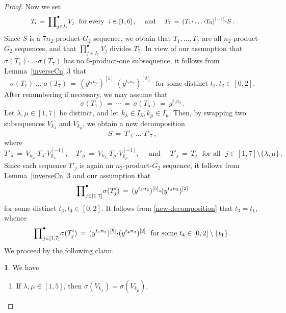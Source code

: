 \documentclass[leqno,a4paper]{amsart}
\def\bd{{\boldsymbol{\cdot}}}
\theoremstyle{plain}
\theoremstyle{definition}
\numberwithin{equation}{section}
\newtheorem{claim}{}[theorem]
\begin{document}
\begin{proof}
        Now we set
        \[
          T_i \, = \, \small{\prod}^{\bullet}_{j \in I_i} V_j \,\, \mbox{ for every } \,\, i \in [1,6] \,, \quad \mbox{ and } \quad T_7 \, = \, (T_1 \bd \ldots \bd T_6)^{[-1]} \bd S \,.
        \]
        Since $S$ is a $7n_2$-product-$G_2$ sequence, we obtain that $T_1, \ldots, T_7$ are all $n_2$-product-$G_2$ sequences, and that $\prod^{\bullet}_{j \in I_7} V_j$ divides $T_7$. In view of our assumption that $\sigma(T_1) \bd \ldots \bd \sigma(T_7)$ has no $6$-product-one subsequence,
		it follows from Lemma~\ref{inverseCn}.3 that
		\begin{equation}\label{str}
	    \sigma(T_1) \bd \ldots \bd \sigma(T_7) \, = \, (y^{t_1n_2})^{[5]} \bd (y^{t_2n_2})^{[2]} \,\, \text{ for some distinct $t_1,t_2 \in [0,2]$}.
		\end{equation}
        After renumbering if necessary, we may assume that
        \[
          \sigma(T_1) \, = \, \cdots \, = \, \sigma(T_5) \, = \, y^{t_1n_2}\,.
        \]	
		Let $\lambda, \mu \in [1,7]$ be distinct, and let $k_{\lambda} \in I_{\lambda}, k_{\mu}\in I_{\mu}$.
		Then, by swapping two subsequences $V_{k_{\lambda}}$ and $V_{k_{\mu}}$, we obtain a new decomposition
		\[
		S \, = \, T'_1 \bd \ldots \bd T'_7 \,,
		\]
		where
		\begin{equation}\label{new-decomposition}
		T'_{\lambda} \, = \, V_{k_{\mu}} \bd T_{\lambda} \bd V_{k_{\lambda}}^{[-1]} \,, \quad T'_{\mu} \, = \, V_{k_{\lambda}} \bd T_{\mu} \bd V_{k_{\mu}}^{[-1]}, \quad \mbox{ and } \quad T'_j \, = \, T_j \,\, \mbox{ for all } \,\, j \in [1,7] \setminus \{ \lambda, \mu \} \,.
		\end{equation}
		Since each sequence $T'_j$ is again an $n_2$-product-$G_2$ sequence, it follows from Lemma~\ref{inverseCn}.3 and our assumption that
        \[
          {\small\prod}^{\bullet}_{j \in [1,7]} \sigma(T'_j) \, = \, (y^{t_3n_2})^{[5]} \bd (y^{t_4 n_2})^{[2]}
        \]
        for some distinct $t_3, t_4 \in [0,2]$. It follows from \eqref{new-decomposition} that $t_3 = t_1$, whence
		\begin{equation}\label{new-str}
		{\small\prod}^{\bullet}_{j \in [1,7]} \sigma(T'_j) \, = \, (y^{t_1n_2})^{[5]} \bd (y^{t_4 n_2})^{[2]} \,\, \text{ for some  $t_4 \in [0,2]\setminus \{t_1\}$} \,.
		\end{equation}
		We proceed by the following claim.
		
        \smallskip
		\begin{claim}\label{claim}
			We have
			\begin{enumerate}
				\item If $\lambda,\mu\in [1,5]$, then $\sigma(V_{k_{\lambda}})=\sigma(V_{k_{\mu}})$.
				

\end{enumerate}
\end{claim}
\end{proof}
\end{document}
